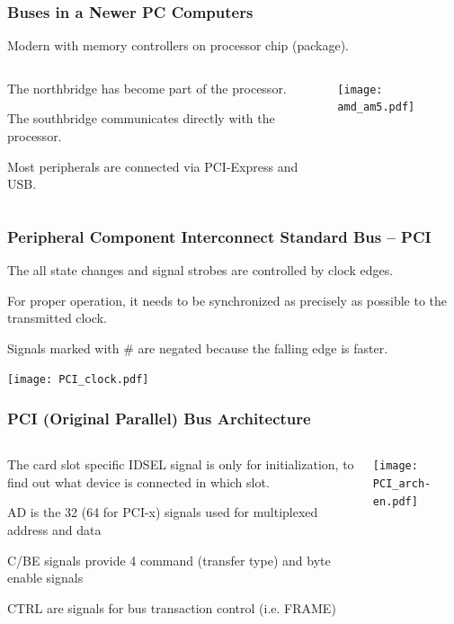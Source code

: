 \documentclass{beamer}
\begin{document}
\begin{frame}
\frametitle{Buses in a Newer PC Computers}

\begin{center}
Modern with memory controllers on processor chip (package).
\end{center}

\begin{columns}
\begin{column}{0.4\textwidth}
The northbridge has become part of the processor.

\bigskip
The southbridge communicates directly with the processor.

\bigskip
Most peripherals are connected via PCI-Express and USB.
\end{column}
\begin{column}{0.6\textwidth}
\texttt{[image: amd\_am5.pdf]}
\end{column}
\end{columns}
\end{frame}


\begin{frame}
\frametitle{Peripheral Component Interconnect Standard Bus -- PCI}

The all state changes and signal strobes are controlled by clock edges.

For proper operation, it needs to be synchronized as precisely as possible to the transmitted clock.

Signals marked with \# are negated because the falling edge is faster.

\begin{center}
\texttt{[image: PCI\_clock.pdf]}
\end{center}
\end{frame}

\begin{frame}
\frametitle{PCI (Original Parallel) Bus Architecture}

\begin{columns}
\begin{column}{0.35\textwidth}
The card slot specific IDSEL signal is only for initialization, to find out what device is connected in which slot.

\medskip
AD is the 32 (64 for PCI-x) signals used for multiplexed address and data

\medskip
C/BE signals provide 4 command (transfer type) and byte enable signals

\medskip
CTRL are signals for bus transaction control (i.e. FRAME)
\end{column}
\begin{column}{0.6\textwidth}
\texttt{[image: PCI\_arch-en.pdf]}
\end{column}
\end{columns}

\end{frame}
\end{document}
